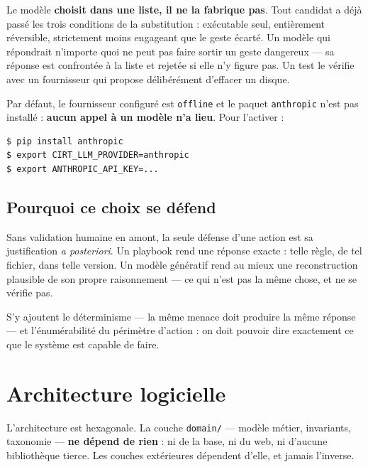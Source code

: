 \begin{tcolorbox}[colback=green!4!white, colframe=darkgreen,
  title=\textbf{Bon à savoir --- l'invariant qui rend cela acceptable},
  fonttitle=\bfseries, boxrule=0.6pt]
Le modèle \textbf{choisit dans une liste, il ne la fabrique pas}. Tout candidat
a déjà passé les trois conditions de la substitution : exécutable seul,
entièrement réversible, strictement moins engageant que le geste écarté. Un
modèle qui répondrait n'importe quoi ne peut pas faire sortir un geste
dangereux — sa réponse est confrontée à la liste et rejetée si elle n'y figure
pas. Un test le vérifie avec un fournisseur qui propose délibérément d'effacer
un disque.
\end{tcolorbox}

Par défaut, le fournisseur configuré est \texttt{offline} et le paquet
\texttt{anthropic} n'est pas installé : \textbf{aucun appel à un modèle n'a
lieu}. Pour l'activer :

\begin{lstlisting}[language=bash]
$ pip install anthropic
$ export CIRT_LLM_PROVIDER=anthropic
$ export ANTHROPIC_API_KEY=...
\end{lstlisting}

\subsection{Pourquoi ce choix se défend}

Sans validation humaine en amont, la seule défense d'une action est sa
justification \emph{a posteriori}. Un playbook rend une réponse exacte : telle
règle, de tel fichier, dans telle version. Un modèle génératif rend au mieux
une reconstruction plausible de son propre raisonnement — ce qui n'est pas la
même chose, et ne se vérifie pas.

S'y ajoutent le déterminisme — la même menace doit produire la même réponse —
et l'énumérabilité du périmètre d'action : on doit pouvoir dire exactement ce
que le système est capable de faire.

\section{Architecture logicielle}

L'architecture est hexagonale. La couche \texttt{domain/} — modèle métier,
invariants, taxonomie — \textbf{ne dépend de rien} : ni de la base, ni du web,
ni d'aucune bibliothèque tierce. Les couches extérieures dépendent d'elle, et
jamais l'inverse.

